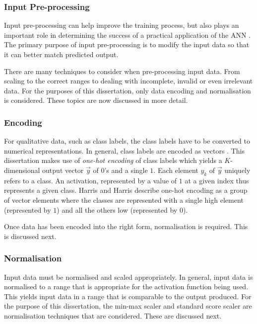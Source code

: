 \subsubsection{Input Pre-processing}
\label{sec:anns:an:input:input_pre_processing}

Input pre-processing can help improve the training process, but also plays an
important role in determining the success of a practical application of the
\ac{ANN} \cite{ref:kuzniar:2017}. The primary purpose of input
pre-processing is to modify the input data so that it can better match predicted
output. 

There are many techniques to consider when pre-processing input data. From
scaling to the correct ranges to dealing with incomplete, invalid or even
irrelevant data. For the purposes of this dissertation, only data encoding and
normalisation is considered. These topics are now discussed in more detail.


\subsubsection{Encoding}
\label{sec:anns:an:input:encoding}

For qualitative data, such as class labels, the class labels have to be
converted to numerical representations. In general, class labels are encoded as
vectors \cite{ref:srinidhi:2018, ref:brownlee:2017:one-hot}. This dissertation makes
use of \textit{one-hot encoding} of class labels which
yields a $K$-dimensional output vector $\vec{y}$ of $0$'s and a single $1$. Each
element $y_k$ of $\vec{y}$ uniquely refers to a class. An activation, represented by a value
of $1$ at a given index thus represents a given class. Harris and Harris
\cite{ref:harris:2010} describe one-hot encoding as a
group of vector elements where the classes are represented
with a single high element (represented by $1$) and all the others low
(represented by $0$).

Once data has been encoded into the right form, normalisation is required. This
is discussed next.


\subsubsection{Normalisation}
\label{sec:anns:an:input:normalisation}

Input data must be normalised and scaled appropriately. In general, input data
is normalised to a range that is appropriate for the activation function being used. This yields input data in a range that
is comparable to the output produced. For the purpose of this dissertation, the
min-max scaler \cite{ref:al:2006} and standard score scaler \cite{ref:jain:2005}
are normalisation techniques that are considered. These are discussed next.

